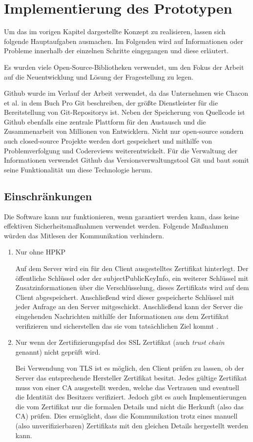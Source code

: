 \chapter{Implementierung des Prototypen}

Um das im vorigen Kapitel dargestellte Konzept zu realisieren, lassen sich folgende Hauptaufgaben ausmachen. Im Folgenden wird auf Informationen oder Probleme innerhalb der einzelnen Schritte eingegangen und diese erläutert.

Es wurden viele Open-Source-Bibliotheken verwendet, um den Fokus der Arbeit auf die Neuentwicklung und Lösung der Fragestellung zu legen.

Github wurde im Verlauf der Arbeit verwendet, da das Unternehmen wie Chacon et al. in dem Buch Pro Git \cite{Chacon2014} beschreiben, der größte Dienstleister für die Bereitstellung von Git-Repositorys ist. Neben der Speicherung von Quellcode ist Github ebenfalls eine zentrale Plattform für den Austausch und die Zusammenarbeit von Millionen von Entwicklern. Nicht nur open-source sondern auch closed-source Projekte werden dort gespeichert und mithilfe von Problemverfolgung und Codereviews weiterentwickelt. Für die Verwaltung der Informationen verwendet Github das Versionsverwaltungstool Git und baut somit seine Funktionalität um diese Technologie herum.

\section{Einschränkungen}
Die Software kann nur funktionieren, wenn garantiert werden kann, dass keine effektiven Sicherheitsmaßnahmen verwendet werden. Folgende Maßnahmen würden das Mitlesen der Kommunikation verhindern.
\begin{enumerate}
    \item Nur ohne \ac{HPKP}
    
    Auf dem Server wird ein für den Client ausgestelltes Zertifikat hinterlegt. Der öffentliche Schlüssel oder der \glqq subjectPublicKeyInfo\grqq{}, ein weiterer Schlüssel mit Zusatzinformationen über die Verschlüsselung, dieses Zertifikats wird auf dem Client abgespeichert. Anschließend wird dieser gespeicherte Schlüssel mit jeder Anfrage an den Server mitgeschickt. Anschließend kann der Server die eingehenden Nachrichten mithilfe der Informationen aus dem Zertifikat verifizieren und sicherstellen das sie vom tatsächlichen Ziel kommt \cite{evans_palmer_sleevi_2015}.
    \item Nur wenn der Zertifizierungspfad des SSL Zertifikat (auch \emph{trust chain} genannt) nicht geprüft wird.
    
    Bei Verwendung von TLS ist es möglich, den Client prüfen zu lassen, ob der Server das entsprechende Hersteller Zertifikat besitzt. Jedes gültige Zertifikat muss von einer \ac{CA} ausgestellt werden, welche das Vertrauen und eventuell die Identität des Besitzers verifiziert. Jedoch gibt es auch Implementierungen die vom Zertifikat nur die formalen Details und nicht die Herkunft (also das \ac{CA}) prüfen.
    Dies ermöglicht, dass die Kommunikation trotz eines manuell (also unverifizierbaren) Zertifikats mit den gleichen Details hergestellt werden kann.
\end{enumerate}


